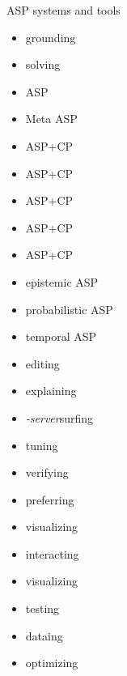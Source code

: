 \providecommand{\purpose}[1]{\hfill #1}
\begin{frame}[c]{ASP systems and tools}
  \begin{minipage}[t]{0.5\linewidth}
    \begin{itemize}
    \item \gringo\purpose{grounding}
    \item \clasp\purpose{solving}
    \item \clingo\purpose{ASP}
    \item \metasp\purpose{Meta ASP}
    \item \clingcon\purpose{ASP+CP}
    \item \fclingo\purpose{ASP+CP}
    \item \clingodl\purpose{ASP+CP}
    \item \clingolp\purpose{ASP+CP}
    \item \clingolpx\purpose{ASP+CP}
    \item \eclingo\purpose{epistemic ASP}
    \item \plingo\purpose{probabilistic ASP}
    \item \telingo\purpose{temporal ASP}
    \end{itemize}
  \end{minipage}
  \pause
  \begin{minipage}[t]{0.4\linewidth}
    \begin{itemize}
    \item \clinsight\purpose{editing}
    \item \xclingo\purpose{explaining}
    \item \clingo\textit{-server}\purpose{surfing}
    \item \acclingo\purpose{tuning}
    \item \anthem\purpose{verifying}
    \item \asprin\purpose{preferring}
    \item \clingraph\purpose{visualizing}
    \item \clinguin\purpose{interacting}
    \item \viasp\purpose{visualizing}
    \item \clintest\purpose{testing}
    \item \clorm\purpose{dataing}
    \item \ngo\purpose{optimizing}
  \end{itemize}
\end{minipage}
\end{frame}
%
